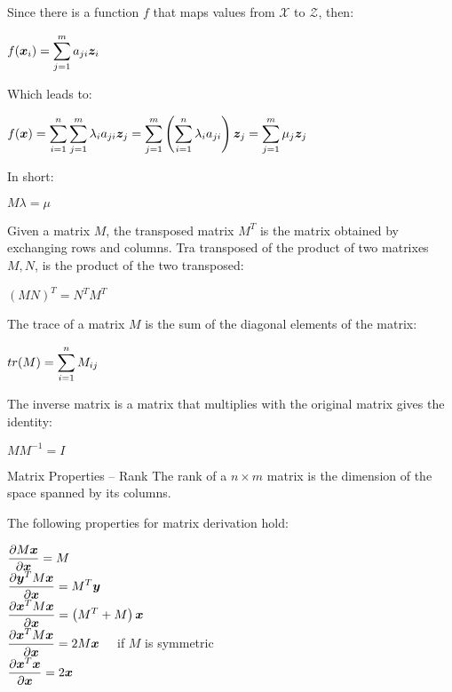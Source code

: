 Since there is a function $f$ that maps values from $\mathcal{X}$ to $\mathcal{Z}$, then:
\begin{center}
	$\displaystyle f(\bm{x}_i )=\displaystyle\sum_{j=1}^ma_{ji}\bm{z}_i$
\end{center}
Which leads to:
\begin{center}
	$\displaystyle f(\bm{x})=\displaystyle\sum_{i=1}^n\displaystyle\sum_{j=1}^m\lambda_ia_{ji}\bm{z}_j=\displaystyle\sum_{j=1}^m\left(\displaystyle\sum_{i=1}^n\lambda_ia_{ji}\right)\bm{z}_j=\displaystyle\sum_{j=1}^m\mu_j\bm{z}_j$
\end{center}
In short:
\begin{center}
	$\displaystyle M\lambda=\mu$
\end{center}
\begin{definition}
Given a matrix $M$, the transposed matrix $M^T$ is the matrix obtained by exchanging rows and columns. Tra transposed of the product of two matrixes $M, N$, is the product of the two transposed:
\begin{center}
	$\displaystyle (MN)^T=N^TM^T$
\end{center}
\end{definition}
\begin{definition}
The trace of a matrix $M$ is the sum of the diagonal elements of the matrix:
\begin{center}
	$\displaystyle tr(M)=\displaystyle\sum_{i=1}^nM_{ij}$
\end{center}
\end{definition}
\begin{definition}
The inverse matrix is a matrix that multiplies with the original matrix gives the identity:
\begin{center}
	$\displaystyle MM^{-1}=I$
\end{center}
\end{definition}
\begin{definition}{Matrix Properties – Rank}
The rank of a $n\times m$ matrix is the dimension of the space spanned by its columns. 
\end{definition}
The following properties for matrix derivation hold:
\begin{center}
	$\displaystyle \frac{\partial M\bm{x}}{\partial\bm{x}}=M$\\
	\vspace{0.2cm}
	$\displaystyle \frac{\partial \bm{y}^TM\bm{x}}{\partial\bm{x}}=M^T\bm{y}$\\
	\vspace{0.2cm}
	$\displaystyle \frac{\partial \bm{x}^TM\bm{x}}{\partial\bm{x}}=\left(M^T+M\right)\bm{x}$\\
	\vspace{0.2cm}
		$\displaystyle \frac{\partial \bm{x}^TM\bm{x}}{\partial\bm{x}}=2M\bm{x}\quad$ if $M$ is symmetric \\
	\vspace{0.2cm}
	$\displaystyle \frac{\partial \bm{x}^T\bm{x}}{\partial\bm{x}}=2\bm{x}$\\
\end{center}
